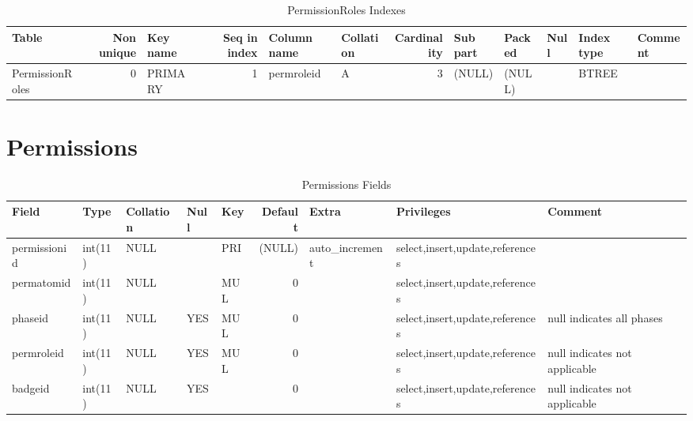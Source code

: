 \documentclass[captions=tablesignature]{scrartcl}
\begin{document}
\begin{table}[htb]
\caption{\label{tbl:permissionrolesindexes}PermissionRoles Indexes}
\centering
\begin{tabular}{lrlrllrlllll}
\hline
Table & Non unique & Key name & Seq in index & Column name & Collation & Cardinality & Sub part & Packed & Null & Index type & Comment\\
\hline
PermissionRoles & 0 & PRIMARY & 1 & permroleid & A & 3 & (NULL) & (NULL) &  & BTREE & \\
\hline
\end{tabular}
\end{table}
\section{Permissions}
\label{sec-15}

\begin{table}[htb]
\caption{\label{tbl:permissionsfields}Permissions Fields}
\centering
\begin{tabular}{lllllrlll}
\hline
Field & Type & Collation & Null & Key & Default & Extra & Privileges & Comment\\
\hline
permissionid & int(11) & NULL &  & PRI & (NULL) & auto\_increment & select,insert,update,references & \\
permatomid & int(11) & NULL &  & MUL & 0 &  & select,insert,update,references & \\
phaseid & int(11) & NULL & YES & MUL & 0 &  & select,insert,update,references & null indicates all phases\\
permroleid & int(11) & NULL & YES & MUL & 0 &  & select,insert,update,references & null indicates not applicable\\
badgeid & int(11) & NULL & YES &  & 0 &  & select,insert,update,references & null indicates not applicable\\
\hline
\end{tabular}
\end{table}
\end{document}

